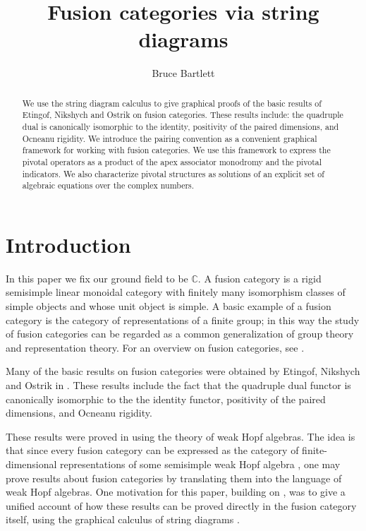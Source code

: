 \documentclass[a4paper]{article}
\theoremstyle{plain}
\theoremstyle{definition}
\begin{document}

\title{Fusion categories via string diagrams}

%
\author{Bruce Bartlett} 

\date{}

\maketitle


\begin{abstract}    %
We use the string diagram calculus to give graphical proofs of the basic results of Etingof, Nikshych and Ostrik \cite{eno02-ofc} on fusion categories. These results include: the quadruple dual is canonically isomorphic to the identity, positivity of the paired dimensions, and Ocneanu rigidity. We introduce the pairing convention as a convenient graphical framework for working with fusion categories. We use this framework to express the pivotal operators as a product of the apex associator monodromy and the pivotal indicators. We also characterize pivotal structures as solutions of an explicit set of algebraic equations over the complex numbers. 
\end{abstract}


\section{Introduction}
In this paper we fix our ground field to be $\mathbb{C}$. A fusion category is a rigid semisimple linear monoidal category with finitely many isomorphism classes of simple objects and whose unit object is simple. A basic example of a fusion category is the category of representations of a finite group; in this way the study of fusion categories can be regarded as a common generalization of group theory and representation theory. For an overview on fusion categories, see \cite{muger2008tensor, calaque2004lectures}.

Many of the basic results on fusion categories were obtained by Etingof, Nikshych and Ostrik in \cite{eno02-ofc}. These results include the fact that the quadruple dual functor is canonically isomorphic to the the identity functor, positivity of the paired dimensions, and Ocneanu rigidity.

These results were proved in \cite{eno02-ofc} using the theory of weak Hopf algebras. The idea is that since every fusion category can be expressed as the category of finite-dimensional representations of some semisimple weak Hopf algebra \cite{eno02-ofc}, one may prove results about fusion categories by translating them into the language of weak Hopf algebras. One motivation for this paper, building on \cite{hh09-snbfcor3, k05-aes, muger2003-subfactors, bv13-ocfc}, was to give a unified account of how these results can be proved directly in the fusion category itself, using the graphical calculus of string diagrams \cite{js91-gtc, js-gtcii, s11-sgc}. 
\end{document}
